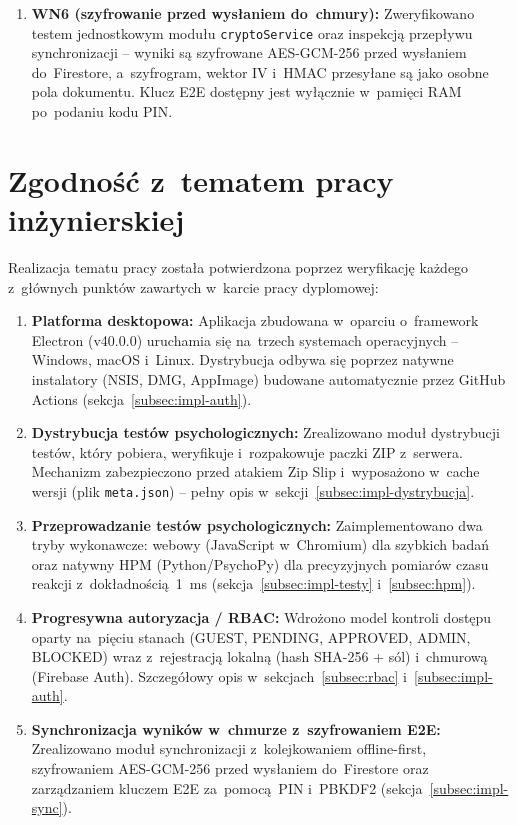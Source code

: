 \documentclass[12pt, a4paper, oneside]{report}
\begin{document}
\begin{enumerate}
	\item \textbf{WN6 (szyfrowanie przed wysłaniem do~chmury):}
	      Zweryfikowano testem jednostkowym modułu \texttt{cryptoService} oraz inspekcją przepływu synchronizacji -- wyniki są szyfrowane AES-GCM-256 przed wysłaniem do~Firestore, a~szyfrogram, wektor IV i~HMAC przesyłane są jako osobne pola dokumentu. Klucz E2E dostępny jest wyłącznie w~pamięci RAM po~podaniu kodu PIN.
\end{enumerate}


\section{Zgodność z~tematem pracy inżynierskiej}
\label{sec:zgodnosc}

Realizacja tematu pracy została potwierdzona poprzez weryfikację każdego z~głównych punktów zawartych w~karcie pracy dyplomowej:

\begin{enumerate}
	\item \textbf{Platforma desktopowa:} Aplikacja zbudowana w~oparciu o~framework Electron (v40.0.0) uruchamia się na~trzech systemach operacyjnych -- Windows, macOS i~Linux. Dystrybucja odbywa się poprzez natywne instalatory (NSIS, DMG, AppImage) budowane automatycznie przez GitHub Actions (sekcja~\ref{subsec:impl-auth}).

	\item \textbf{Dystrybucja testów psychologicznych:} Zrealizowano moduł dystrybucji testów, który pobiera, weryfikuje i~rozpakowuje paczki ZIP z~serwera. Mechanizm zabezpieczono przed atakiem Zip Slip i~wyposażono w~cache wersji (plik \texttt{meta.json}) -- pełny opis w~sekcji~\ref{subsec:impl-dystrybucja}.

	\item \textbf{Przeprowadzanie testów psychologicznych:} Zaimplementowano dwa tryby wykonawcze: webowy (JavaScript w~Chromium) dla szybkich badań oraz natywny HPM (Python/PsychoPy) dla precyzyjnych pomiarów czasu reakcji z~dokładnością~1~ms (sekcja~\ref{subsec:impl-testy} i~\ref{subsec:hpm}).

	\item \textbf{Progresywna autoryzacja / RBAC:} Wdrożono model kontroli dostępu oparty na~pięciu stanach (GUEST, PENDING, APPROVED, ADMIN, BLOCKED) wraz z~rejestracją lokalną (hash SHA-256 + sól) i~chmurową (Firebase Auth). Szczegółowy opis w~sekcjach~\ref{subsec:rbac} i~\ref{subsec:impl-auth}.

	\item \textbf{Synchronizacja wyników w~chmurze z~szyfrowaniem E2E:} Zrealizowano moduł synchronizacji z~kolejkowaniem offline-first, szyfrowaniem AES-GCM-256 przed wysłaniem do~Firestore oraz zarządzaniem kluczem E2E za~pomocą~PIN i~PBKDF2 (sekcja~\ref{subsec:impl-sync}).
\end{enumerate}
\end{document}
